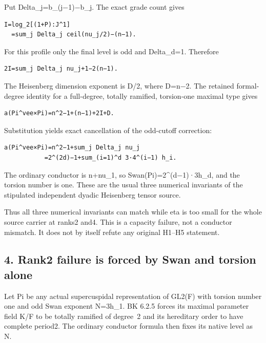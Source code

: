 Put Delta\_j=b\_(j−1)−b\_j. The exact grade count gives

\begin{Verbatim}[fontsize=\small,breaklines=true,breakanywhere=true]
I=log_2[(1+P):J^1]
  =sum_j Delta_j ceil(nu_j/2)−(n−1).
\end{Verbatim}

For this profile only the final level is odd and Delta\_d=1. Therefore

\begin{Verbatim}[fontsize=\small,breaklines=true,breakanywhere=true]
2I=sum_j Delta_j nu_j+1−2(n−1).
\end{Verbatim}

The Heisenberg dimension exponent is D/2, where D=n−2. The retained
formal-degree identity for a full-degree, totally ramified, torsion-one
maximal type gives

\begin{Verbatim}[fontsize=\small,breaklines=true,breakanywhere=true]
a(Pi^vee×Pi)=n^2−1+(n−1)+2I+D.
\end{Verbatim}

Substitution yields exact cancellation of the odd-cutoff correction:

\begin{Verbatim}[fontsize=\small,breaklines=true,breakanywhere=true]
a(Pi^vee×Pi)=n^2−1+sum_j Delta_j nu_j
           =2^(2d)−1+sum_(i=1)^d 3·4^(i−1) h_i.
\end{Verbatim}

The ordinary conductor is n+nu\_1, so Swan(Pi)=2\^{}(d−1)·3h\_d, and the
torsion number is one. These are the usual three numerical invariants of
the stipulated independent dyadic Heisenberg tensor source.

Thus all three numerical invariants can match while eta is too small for
the whole source carrier at ranks2 and4. This is a capacity failure, not
a conductor mismatch. It does not by itself refute any original H1--H5
statement.

\hypertarget{dyadic_capacity-rank~2-failure-is-forced-by-swan-and-torsion-alone}{%
\subsection{4. Rank2 failure is forced by Swan and torsion
alone}\label{dyadic_capacity-rank~2-failure-is-forced-by-swan-and-torsion-alone}}

Let Pi be any actual supercuspidal representation of GL2(F) with torsion
number one and odd Swan exponent N=3h\_1. BK 6.2.5 forces its maximal
parameter field K/F to be totally ramified of degree~2 and its hereditary
order to have complete period2. The ordinary conductor formula then
fixes its native level as N.

